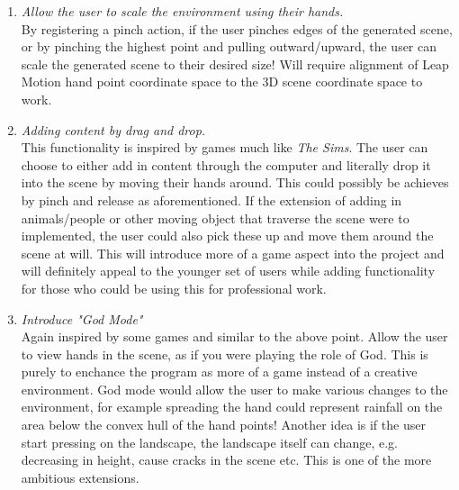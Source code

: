 \documentclass[11pt]{article}
\begin{document}
\begin{enumerate}
	\item \textit{Allow the user to scale the environment using their hands.} \\
		  By registering a pinch action, if the user pinches edges of the
		  generated scene, or by pinching the highest point and pulling 
		  outward/upward, the user can scale the generated scene to their 
		  desired size! Will require alignment of Leap Motion hand point 
		  coordinate space to the 3D scene coordinate space to work.
	\item \textit{Adding content by drag and drop.}\\
		  This functionality is inspired by games much like \textit{The Sims}.
		  The user can choose to either add in content through the computer and
		  literally drop it into the scene by moving their hands around. This
		  could possibly be achieves by pinch and release as aforementioned. 
		  If the extension of adding in animals/people or other moving object
		  that traverse the scene were to implemented, the user could also
		  pick these up and move them around the scene at will. This will 
		  introduce more of a game aspect into the project and will definitely
		  appeal to the younger set of users while adding functionality for
		  those who could be using this for professional work.
	\item \textit{Introduce "God Mode"}\\
		  Again inspired by some games and similar to the above point. Allow
		  the user to view hands in the scene, as if you were playing the
		  role of God. This is purely to enchance the program as more of a game
		  instead of a creative environment. God mode would allow the user to
		  make various changes to the environment, for example spreading the hand
		  could represent rainfall on the area below the convex hull of the hand
		  points! Another idea is if the user start  pressing on the landscape, the
		  landscape itself can change, e.g. decreasing in height, cause cracks in
		  the scene etc. This is one of the more ambitious extensions.
\end{enumerate}
\end{document}
